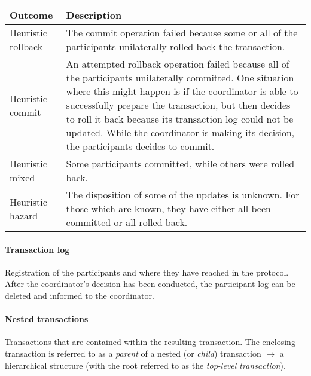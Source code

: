 \hskip-0.5cm
\begin{tabularx}{\linewidth}{p{1.5cm} X}
	Outcome & Description \\
	\hline
	Heuristic rollback & The commit operation failed because some or all of the participants unilaterally rolled back the transaction. \\
  Heuristic commit & An attempted rollback operation failed because all of the participants unilaterally committed. One situation where this might happen is if the coordinator is able to successfully prepare the transaction, but then decides to roll it back because its transaction log could not be updated. While the coordinator is making its decision, the participants decides to commit. \\
  Heuristic mixed & Some participants committed, while others were rolled back.\\
  Heuristic hazard & The disposition of some of the updates is unknown. For those which are known, they have either all been committed or all rolled back.\\
\end{tabularx}


\paragraph{Transaction log} Registration of the participants and where they have reached in the protocol. After the coordinator's decision has been conducted, the participant log can be deleted and informed to the coordinator.

\paragraph{Nested transactions} Transactions that are contained within the resulting transaction. The enclosing transaction is referred to as a \textit{parent} of a nested (or \textit{child}) transaction $\rightarrow$ a hierarchical structure (with the root referred to as the \textit{top-level transaction}).

